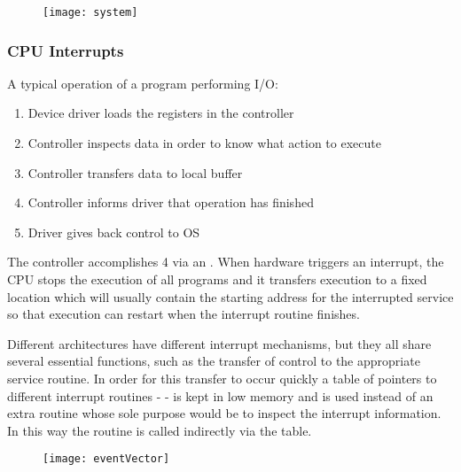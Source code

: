 	\begin{figure}[H]
		\begin{center}
		\texttt{[image: system]}
		\end{center}
	\end{figure}


	\subsubsection{CPU Interrupts}

		\par{A typical operation of a program performing I/O:}

			\begin{enumerate}
				\item Device driver loads the registers in the controller
				\item Controller inspects data in order to know what action to execute
				\item Controller transfers data to local buffer
				\item Controller informs driver that operation has finished
				\item Driver gives back control to OS
			\end{enumerate}

		\par{The controller accomplishes 4 via an . When hardware triggers an interrupt, the CPU stops the execution of all programs and it transfers execution to a fixed location which will usually contain the starting address for the interrupted service so that execution can restart when the interrupt routine finishes.}
		\par{Different architectures have different interrupt mechanisms, but they all share several essential functions, such as the transfer of control to the appropriate service routine. In order for this transfer to occur quickly a table of pointers to different interrupt routines -  - is kept in low memory and is used instead of an extra routine whose sole purpose would be to inspect the interrupt information. In this way the routine is called indirectly via the table.}

		\begin{figure}[H]
		\begin{center}
		\texttt{[image: eventVector]}
		\end{center}
	\end{figure}


